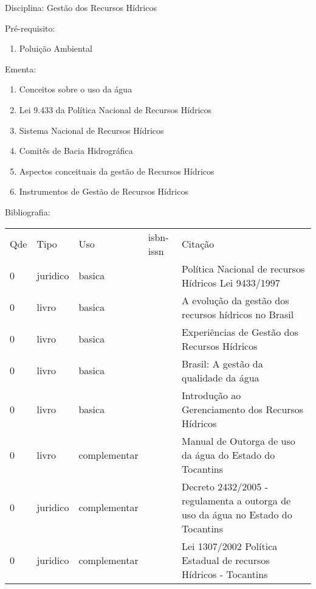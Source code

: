 \documentclass[12pt,a4paper,twoside]{report}
\begin{document}
Disciplina: Gestão dos Recursos Hídricos

Pré-requisito:
\begin{enumerate}
\item Poluição Ambiental
\end{enumerate}

Ementa:
\begin{enumerate}
\item Conceitos sobre o uso da água
\item Lei 9.433 da Política Nacional de Recursos Hídricos
\item Sistema Nacional de Recursos Hídricos
\item Comitês de Bacia Hidrográfica
\item Aspectos conceituais da gestão de Recursos Hídricos
\item Instrumentos de Gestão de Recursos Hídricos
\end{enumerate}

Bibliografia:
\begin{tabular}{lllll}
Qde & Tipo & Uso & isbn-issn & Citação \\
0&juridico&basica&&Política Nacional de recursos Hídricos Lei 9433/1997\\
0&livro&basica&&A evolução da gestão dos recursos hídricos no Brasil\\
0&livro&basica&&Experiências de Gestão dos Recursos Hídricos\\
0&livro&basica&&Brasil: A gestão da qualidade da água\\
0&livro&basica&&Introdução ao Gerenciamento dos Recursos Hídricos\\
0&livro&complementar&&Manual de Outorga de uso da água do Estado do Tocantins\\
0&juridico&complementar&&Decreto 2432/2005 - regulamenta a outorga de uso da água no Estado do Tocantins\\
0&juridico&complementar&&Lei 1307/2002 Política Estadual de recursos Hídricos - Tocantins\\
\end{tabular}
\end{document}
